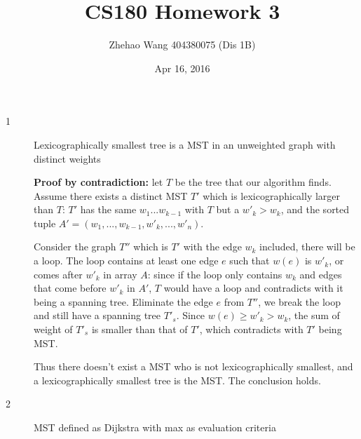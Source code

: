 \documentclass{article}
\title{CS180 Homework 3}
\author{Zhehao Wang 404380075 (Dis 1B)}
\date{Apr 16, 2016}
\begin{document}
\maketitle

\begin{description}

\item[1]{Lexicographically smallest tree is a MST in an unweighted graph with distinct weights}
  


  \textbf{Proof by contradiction:} let $T$ be the tree that our algorithm finds. Assume there exists a distinct MST $T'$ which is lexicographically larger than $T$: $T'$ has the same $w_1...w_{k-1}$ with $T$ but a $w'_k > w_k$, and the sorted tuple $A' = (w_1,...,w_{k-1}, w'_k, ..., w'_n)$. 

  Consider the graph $T''$ which is $T'$ with the edge $w_k$ included, there will be a loop. The loop contains at least one edge $e$ such that $w(e)$ is $w'_k$, or comes after $w'_k$ in array $A$: since if the loop only contains $w_k$ and edges that come before $w'_k$ in $A'$, $T$ would have a loop and contradicts with it being a spanning tree. Eliminate the edge $e$ from $T''$, we break the loop and still have a spanning tree $T'_s$. Since $w(e) \geq w'_k > w_k$, the sum of weight of $T'_s$ is smaller than that of $T'$, which contradicts with $T'$ being MST.

  Thus there doesn't exist a MST who is not lexicographically smallest, and a lexicographically smallest tree is the MST. The conclusion holds.

\item[2]{MST defined as Dijkstra with max as evaluation criteria}


\end{description}
\end{document}
